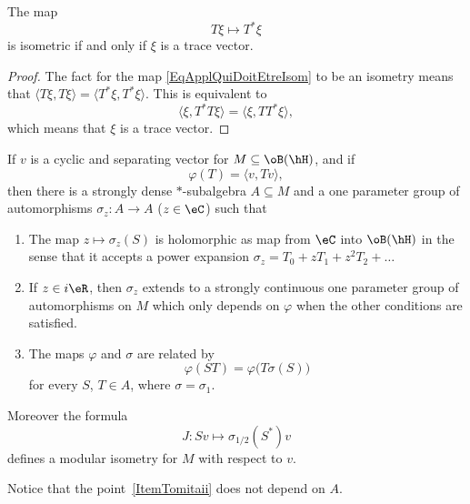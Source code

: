 \begin{lemma}
	The map
	\begin{equation}	\label{EqApplQuiDoitEtreIsom}
		T\xi\mapsto T^*\xi
	\end{equation}
	is isometric if and only if $\xi$ is a trace vector.
\end{lemma}

\begin{proof}
	The fact for the map \eqref{EqApplQuiDoitEtreIsom} to be an isometry means that $\langle T\xi, T\xi\rangle =\langle T^*\xi, T^*\xi\rangle $. This is equivalent to
	\begin{equation}
		\langle \xi, T^*T\xi\rangle =\langle \xi, TT^*\xi\rangle ,
	\end{equation}
	which means that $\xi$ is a trace vector.
\end{proof}

\begin{theorem}
	If $v$ is a cyclic and separating vector for $M\subseteq\oB(\hH)$, and if
	\begin{equation}
		\varphi(T)=\langle v, Tv\rangle ,
	\end{equation}
	then there is a strongly dense $*$-subalgebra $A\subseteq M$ and a one parameter group of automorphisms $\sigma_z\colon A\to A$ ($z\in\eC$) such that
	\begin{enumerate}
		\item The map $z\mapsto \sigma_z(S)$ is holomorphic as map from $\eC$ into $\oB(\hH)$ in the sense that it accepts a power expansion $\sigma_z=T_0+zT_1+z^2T_2+\ldots$
		      \item\label{ItemTomitaii} If $z\in i\eR$, then $\sigma_z$ extends to a strongly continuous one parameter group of automorphisms on $M$ which only depends on $\varphi$ when the other conditions are satisfied.
		\item The maps $\varphi$ and $\sigma$ are related by
		      \begin{equation}
			      \varphi(ST)=\varphi\big( T\sigma(S) \big)
		      \end{equation}
		      for every $S$, $T\in A$, where $\sigma=\sigma_1$.
	\end{enumerate}
	Moreover the formula
	\begin{equation}
		J\colon Sv\mapsto \sigma_{1/2}(S^*)v
	\end{equation}
	defines a modular isometry for $M$ with respect to $v$.
\end{theorem}
Notice that the point~\ref{ItemTomitaii} does not depend on $A$.

